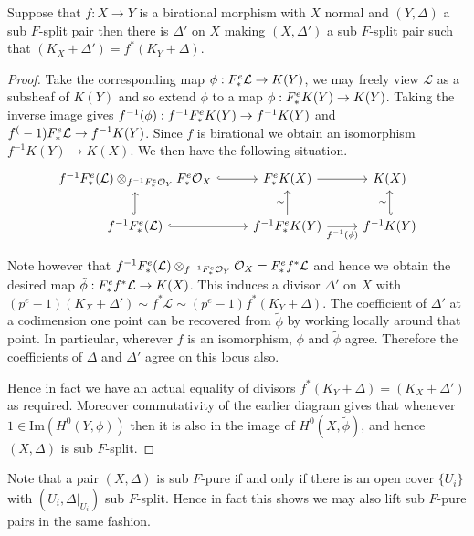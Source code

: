 \begin{lemma}\label{F-pullback}
	Suppose that $f:X \to Y$ is a birational morphism with $X$ normal and $(Y,\Delta)$ a sub $F$-split pair then there is $\Delta'$ on $X$ making $(X,\Delta')$ a sub $F$-split pair such that $(K_{X}+\Delta')=f^{*}(K_{Y}+\Delta)$.  
\end{lemma}
\begin{proof}
	
	Take the corresponding map $\phi: F^{e}_{*}\mathcal{L} \to K(Y)$, we may freely view $\mathcal{L}$ as a subsheaf of $K(Y)$ and so extend $\phi$ to a map $\phi: F^{e}_{*} K(Y) \to K(Y)$. Taking the inverse image gives $f^{-1}(\phi): f^{-1}F^{e}_{*} K(Y) \to f^{-1}K(Y)$ and $f^(-1)F^{e}_{*} \mathcal{L} \to f^{-1}K(Y)$. Since $f$ is birational we obtain an isomorphism $f^{-1}K(Y) \to K(X)$. We then have the following situation.
	\[\begin{tikzcd}
	f^{-1}\Fe(\mathcal{L}) \otimes_{f^{-1}\Fe\mathcal{O}_{Y}}\Fe\ox \arrow[r, hook] & \Fe K(X) \arrow[r]                                          & K(X)                                \\
	f^{-1}\Fe(\mathcal{L}) \arrow[r, hook] \arrow[u, hook]                       & f^{-1}\Fe K(Y) \arrow[r, "f^{-1}(\phi)"'] \arrow[u, "\sim"] & f^{-1}K(Y) \arrow[u, "\sim", hook']
	\end{tikzcd}\]
	
	Note however that $f^{-1}F^{e}_{*}(\mathcal{L}) \otimes_{f^{-1}F^{e}_{*}\mathcal{O}_{Y}}\mathcal{O}_{X}= F^{e}_{*} f^{*}\mathcal{L}$ and hence we obtain the desired map $\tilde{\phi}: F^{e}_{*} f^{*}\mathcal{L} \to K(X)$. This induces a divisor $\Delta'$ on $X$ with $(p^{e}-1)(K_{X}+\Delta') \sim f^{*}\mathcal{L} \sim (p^{e}-1)f^{*}(K_{Y}+\Delta)$. The coefficient of $\Delta'$ at a codimension one point can be recovered from $\tilde{\phi}$ by working locally around that point. In particular, wherever $f$ is an isomorphism, $\phi$ and $\tilde{\phi}$ agree. Therefore the coefficients of $\Delta$ and $\Delta'$ agree on this locus also.
	
	Hence in fact we have an actual equality of divisors $f^{*}(K_{Y}+\Delta)=(K_{X}+\Delta')$ as required. Moreover commutativity of the earlier diagram gives that whenever $1 \in \text{Im}(H^{0}(Y,\phi))$ then it is also in the image of $H^{0}(X,\tilde{\phi})$, and hence $(X,\Delta)$ is sub $F$-split.
\end{proof}

Note that a pair $(X,\Delta)$ is sub $F$-pure if and only if there is an open cover $\{U_{i}\}$ with $(U_{i},\Delta|_{U_{i}})$ sub $F$-split. Hence in fact this shows we may also lift sub $F$-pure pairs in the same fashion. 


